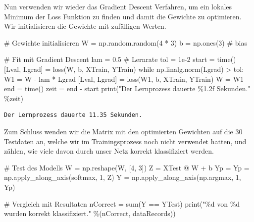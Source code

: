 \documentclass[
  a4paper,
  DIV=11]{scrreprt}
\newenvironment{Shaded}{\begin{snugshade}}{\end{snugshade}}
\newcommand{\BuiltInTok}[1]{\textcolor[rgb]{0.00,0.23,0.31}{#1}}
\newcommand{\CommentTok}[1]{\textcolor[rgb]{0.37,0.37,0.37}{#1}}
\newcommand{\ControlFlowTok}[1]{\textcolor[rgb]{0.00,0.23,0.31}{#1}}
\newcommand{\DecValTok}[1]{\textcolor[rgb]{0.68,0.00,0.00}{#1}}
\newcommand{\FloatTok}[1]{\textcolor[rgb]{0.68,0.00,0.00}{#1}}
\newcommand{\NormalTok}[1]{\textcolor[rgb]{0.00,0.23,0.31}{#1}}
\newcommand{\OperatorTok}[1]{\textcolor[rgb]{0.37,0.37,0.37}{#1}}
\newcommand{\SpecialCharTok}[1]{\textcolor[rgb]{0.37,0.37,0.37}{#1}}
\newcommand{\StringTok}[1]{\textcolor[rgb]{0.13,0.47,0.30}{#1}}
\theoremstyle{definition}
\theoremstyle{definition}
\theoremstyle{remark}
\begin{document}
Nun verwenden wir wieder das Gradient Descent Verfahren, um ein lokales
Minimum der Loss Funktion zu finden und damit die Gewichte zu
optimieren. Wir initialisieren die Gewichte mit zufälligen Werten.

\begin{Shaded}
\begin{Highlighting}[]
\CommentTok{\# Gewichte initialisieren}
\NormalTok{W }\OperatorTok{=}\NormalTok{ np.random.random(}\DecValTok{4} \OperatorTok{*} \DecValTok{3}\NormalTok{)}
\NormalTok{b }\OperatorTok{=}\NormalTok{ np.ones(}\DecValTok{3}\NormalTok{)  }\CommentTok{\# bias}

\CommentTok{\# Fit mit Gradient Descent}
\NormalTok{lam }\OperatorTok{=} \FloatTok{0.5} \CommentTok{\# Lernrate}
\NormalTok{tol }\OperatorTok{=} \FloatTok{1e{-}2}
\NormalTok{start }\OperatorTok{=}\NormalTok{ time()}
\NormalTok{[Lval, Lgrad] }\OperatorTok{=}\NormalTok{ loss(W, b, XTrain, YTrain)}
\ControlFlowTok{while}\NormalTok{ np.linalg.norm(Lgrad) }\OperatorTok{\textgreater{}}\NormalTok{ tol:}
\NormalTok{    W1 }\OperatorTok{=}\NormalTok{ W }\OperatorTok{{-}}\NormalTok{ lam }\OperatorTok{*}\NormalTok{ Lgrad}
\NormalTok{    [Lval, Lgrad] }\OperatorTok{=}\NormalTok{ loss(W1, b, XTrain, YTrain)}
\NormalTok{    W }\OperatorTok{=}\NormalTok{ W1}
\NormalTok{end }\OperatorTok{=}\NormalTok{ time()}
\NormalTok{zeit }\OperatorTok{=}\NormalTok{ end }\OperatorTok{{-}}\NormalTok{ start}
\BuiltInTok{print}\NormalTok{(}\StringTok{"Der Lernprozess dauerte }\SpecialCharTok{\%1.2f}\StringTok{ Sekunden."} \OperatorTok{\%}\NormalTok{zeit)}
\end{Highlighting}
\end{Shaded}

\begin{verbatim}
Der Lernprozess dauerte 11.35 Sekunden.
\end{verbatim}

Zum Schluss wenden wir die Matrix mit den optimierten Gewichten auf die
30 Testdaten an, welche wir im Trainingsprozess noch nicht verwendet
hatten, und zählen, wie viele davon durch unser Netz korrekt
klassifiziert werden.

\begin{Shaded}
\begin{Highlighting}[]
\CommentTok{\# Test des Modells}
\NormalTok{W }\OperatorTok{=}\NormalTok{ np.reshape(W, [}\DecValTok{4}\NormalTok{, }\DecValTok{3}\NormalTok{])}
\NormalTok{Z }\OperatorTok{=}\NormalTok{ XTest }\OperatorTok{@}\NormalTok{ W }\OperatorTok{+}\NormalTok{ b}
\NormalTok{Yp }\OperatorTok{=}\NormalTok{ Yp }\OperatorTok{=}\NormalTok{ np.apply\_along\_axis(softmax, }\DecValTok{1}\NormalTok{, Z)}
\NormalTok{Y }\OperatorTok{=}\NormalTok{ np.apply\_along\_axis(np.argmax, }\DecValTok{1}\NormalTok{, Yp)}

\CommentTok{\# Vergleich mit Resultaten}
\NormalTok{nCorrect }\OperatorTok{=} \BuiltInTok{sum}\NormalTok{(Y }\OperatorTok{==}\NormalTok{ YTest)}
\BuiltInTok{print}\NormalTok{(}\StringTok{"}\SpecialCharTok{\%d}\StringTok{ von }\SpecialCharTok{\%d}\StringTok{ wurden korrekt klassifiziert."} \OperatorTok{\%}\NormalTok{(nCorrect, dataRecords))}
\end{Highlighting}
\end{Shaded}
\end{document}
